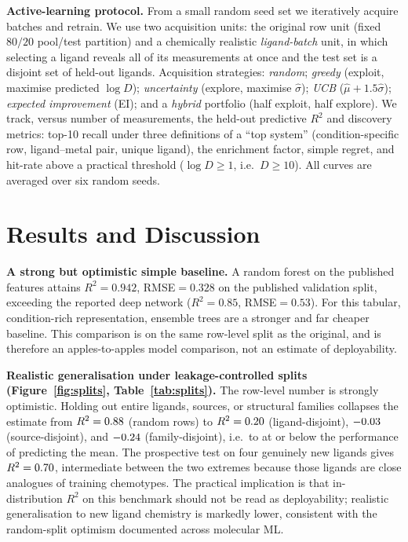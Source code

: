 \documentclass[journal=acsodf,manuscript=article]{achemso}
\begin{document}
\textbf{Active-learning protocol.} From a small random seed set we iteratively acquire
batches and retrain. We use two acquisition units: the original row unit
(fixed $80/20$ pool/test partition) and a chemically realistic \emph{ligand-batch}
unit, in which selecting a ligand reveals all of its measurements at once and the
test set is a disjoint set of held-out ligands. Acquisition strategies: \emph{random};
\emph{greedy} (exploit, maximise predicted $\log D$); \emph{uncertainty} (explore,
maximise $\hat\sigma$); \emph{UCB} ($\hat\mu+1.5\hat\sigma$); \emph{expected
improvement} (EI)\cite{Jones_1998,Shahriari_2016}; and a \emph{hybrid} portfolio
(half exploit, half explore). We track, versus number of measurements, the held-out
predictive $R^2$ and discovery metrics: top-10 recall under three definitions of a
``top system'' (condition-specific row, ligand--metal pair, unique ligand), the
enrichment factor,\cite{Truchon_2007,Ash_2022} simple regret, and hit-rate above a
practical threshold ($\log D\ge 1$, i.e.\ $D\ge 10$). All curves are averaged over six
random seeds.

\section{Results and Discussion}
\textbf{A strong but optimistic simple baseline.} A random forest on the published
features attains $R^2=0.942$, RMSE$=0.328$ on the published validation split,
exceeding the reported deep network ($R^2=0.85$, RMSE$=0.53$).\cite{Liu_2022} For this
tabular, condition-rich representation, ensemble trees are a stronger and far cheaper
baseline. This comparison is on the same row-level split as the original, and is
therefore an apples-to-apples model comparison, not an estimate of deployability.

\textbf{Realistic generalisation under leakage-controlled splits
(Figure~\ref{fig:splits}, Table~\ref{tab:splits}).} The row-level number is
strongly optimistic. Holding out entire ligands, sources, or structural families
collapses the estimate from $R^2=0.88{}$ (random rows) to
$R^2=0.20{}$ (ligand-disjoint), $-0.03{}$ (source-disjoint), and
$-0.24{}$ (family-disjoint), i.e.\ to at or below the performance of predicting
the mean. The prospective test on four genuinely new ligands gives
$R^2=0.70{}$, intermediate between the two extremes because those ligands
are close analogues of training chemotypes. The practical implication is that
in-distribution $R^2$ on this benchmark should not be read as deployability; realistic
generalisation to new ligand chemistry is markedly lower, consistent with the
random-split optimism documented across molecular ML.\cite{Sheridan_2013,Guo_2024}
\end{document}
